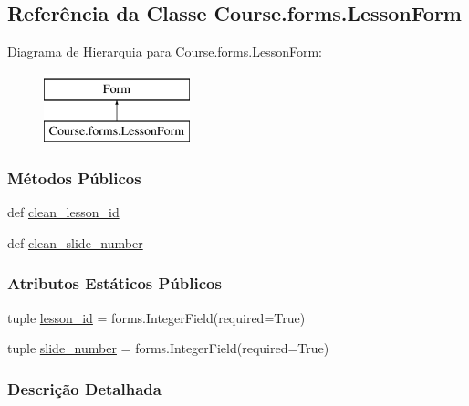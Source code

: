 \hypertarget{classCourse_1_1forms_1_1LessonForm}{\subsection{Referência da Classe Course.\-forms.\-Lesson\-Form}
\label{classCourse_1_1forms_1_1LessonForm}
}
Diagrama de Hierarquia para Course.\-forms.\-Lesson\-Form\-:\begin{figure}[H]
\begin{center}
\leavevmode
\includegraphics[height=2.000000cm]{db/d84/classCourse_1_1forms_1_1LessonForm}
\end{center}
\end{figure}
\subsubsection*{Métodos Públicos}
\begin{DoxyCompactItemize}
\item 
def \hyperlink{classCourse_1_1forms_1_1LessonForm_ad33e136f4ab11e780c0c1d1267769ab7}{clean\-\_\-lesson\-\_\-id}
\item 
def \hyperlink{classCourse_1_1forms_1_1LessonForm_acc15a807e96d131c1c839ee28da158de}{clean\-\_\-slide\-\_\-number}
\end{DoxyCompactItemize}
\subsubsection*{Atributos Estáticos Públicos}
\begin{DoxyCompactItemize}
\item 
tuple \hyperlink{classCourse_1_1forms_1_1LessonForm_a0ed8ca8dc81ac7498c83df4a5735ce04}{lesson\-\_\-id} = forms.\-Integer\-Field(required=True)
\item 
tuple \hyperlink{classCourse_1_1forms_1_1LessonForm_ad030e96bd25bff769cce537955b318d1}{slide\-\_\-number} = forms.\-Integer\-Field(required=True)
\end{DoxyCompactItemize}


\subsubsection{Descrição Detalhada}


